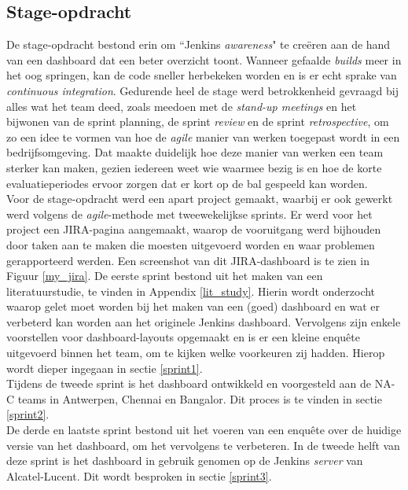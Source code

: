 \documentclass[10pt,a4paper]{article}
\begin{document}
\subsection{Stage-opdracht}
\label{opdracht}
De stage-opdracht bestond erin om ``Jenkins \textit{awareness}" te cre\"eren aan de hand van een dashboard dat een beter overzicht toont.
Wanneer gefaalde \textit{builds} meer in het oog springen, kan de code sneller herbekeken worden en is er echt sprake van \textit{continuous integration}.  Gedurende heel de stage werd betrokkenheid gevraagd bij alles wat het team deed, zoals meedoen met de \textit{stand-up meetings} en het bijwonen van de sprint planning, de sprint \textit{review} en de sprint \textit{retrospective}, om zo een idee te vormen van hoe de \textit{agile} manier van werken toegepast wordt in een bedrijfsomgeving. Dat maakte duidelijk hoe deze manier van werken een team sterker kan maken, gezien iedereen weet wie waarmee bezig is en hoe de korte evaluatieperiodes ervoor zorgen dat er kort op de bal gespeeld kan worden.\\
Voor de stage-opdracht werd een apart project gemaakt, waarbij er ook gewerkt werd volgens de \textit{agile}-methode met tweewekelijkse sprints. Er werd voor het project een JIRA-pagina aangemaakt, waarop de vooruitgang werd bijhouden door taken aan te maken die  moesten uitgevoerd worden en waar problemen gerapporteerd werden. Een screenshot van dit JIRA-dashboard is te zien in Figuur \ref{my_jira}.
De eerste sprint bestond uit het maken van een literatuurstudie, te vinden in Appendix \ref{lit_study}. Hierin wordt onderzocht waarop gelet moet worden bij het maken van een (goed) dashboard en wat er verbeterd kan worden aan het originele Jenkins dashboard. Vervolgens zijn enkele voorstellen voor dashboard-layouts opgemaakt en is er een kleine enqu\^ete uitgevoerd binnen het team, om te kijken welke voorkeuren zij hadden. Hierop wordt dieper ingegaan in sectie \ref{sprint1}.\\
Tijdens de tweede sprint is het dashboard ontwikkeld en voorgesteld aan de NA-C teams in Antwerpen, Chennai en Bangalor. Dit proces is te vinden in sectie \ref{sprint2}.\\
De derde en laatste sprint bestond uit het voeren van een enqu\^ete over de huidige versie van het dashboard, om het vervolgens te verbeteren. In de tweede helft van deze sprint is het dashboard in gebruik genomen op de Jenkins \textit{server} van Alcatel-Lucent. Dit wordt besproken in sectie \ref{sprint3}.
\end{document}

